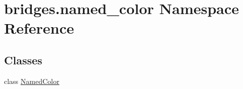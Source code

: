 \hypertarget{namespacebridges_1_1named__color}{}\section{bridges.\+named\+\_\+color Namespace Reference}
\label{namespacebridges_1_1named__color}
\subsection*{Classes}
\begin{DoxyCompactItemize}
\item 
class \hyperlink{classbridges_1_1named__color_1_1_named_color}{Named\+Color}
\end{DoxyCompactItemize}
